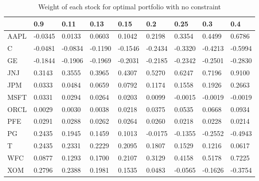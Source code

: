 \documentclass[a4paper,11pt,twoside]{article}
\begin{document}
\begin{center} %
\begin{table}[H]
\centering
\begin{tabular}{| l | llllllll |}
\hline
& 0.9  & 0.11    & 0.13    & 0.15    & 0.2     & 0.25    & 0.3     & 0.4     \\
\hline
\hline
AAPL & -0.0345 & 0.0133  & 0.0603  & 0.1042  & 0.2198  & 0.3354  & 0.4499  & 0.6786  \\
C    & -0.0481 & -0.0834 & -0.1190 & -0.1546 & -0.2434 & -0.3320 & -0.4213 & -0.5994 \\
GE   & -0.1844 & -0.1906 & -0.1969 & -0.2031 & -0.2185 & -0.2342 & -0.2501 & -0.2830 \\
JNJ  & 0.3143  & 0.3555  & 0.3965  & 0.4307  & 0.5270  & 0.6247  & 0.7196  & 0.9100  \\
JPM  & 0.0333  & 0.0484  & 0.0659  & 0.0792  & 0.1174  & 0.1558  & 0.1926  & 0.2663  \\
MSFT & 0.0331  & 0.0294  & 0.0264  & 0.0203  & 0.0099  & -0.0015 & -0.0019 & -0.0019 \\
ORCL & 0.0029  & 0.0030  & 0.0038  & 0.0218  & 0.0375  & 0.0535  & 0.0668  & 0.0934  \\
PFE  & 0.0291  & 0.0288  & 0.0262  & 0.0264  & 0.0260  & 0.0218  & 0.0228  & 0.0214  \\
PG   & 0.2435  & 0.1945  & 0.1459  & 0.1013  & -0.0175 & -0.1355 & -0.2552 & -0.4943 \\
T    & 0.2435  & 0.2331  & 0.2229  & 0.2095  & 0.1807  & 0.1529  & 0.1216  & 0.0617  \\
WFC  & 0.0877  & 0.1293  & 0.1700  & 0.2107  & 0.3129  & 0.4158  & 0.5178  & 0.7225  \\
XOM  & 0.2796  & 0.2388  & 0.1981  & 0.1535  & 0.0483  & -0.0565 & -0.1626 & -0.3754 \\ 
\hline
\end{tabular}\label{table_short}
\caption{Weight of each stock for optimal portfolio with no constraint}
\end{table}
\end{center}
\end{document}
